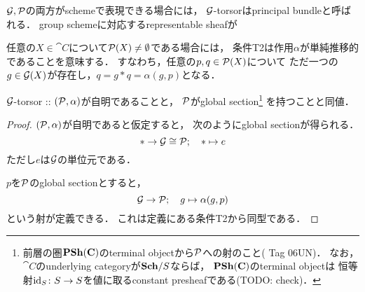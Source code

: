 \documentclass[a4paper, dvipdfmx]{jsarticle}
\begin{document}
\begin{Remark}
    $\shG, \shP$の両方がschemeで表現できる場合には，
    $\shG$-torsorはprincipal bundleと呼ばれる．
    group schemeに対応するrepresentable sheafが
\end{Remark}

\begin{Remark}
    任意の$X \in \cat{C}$について$\shP(X) \neq \emptyset$である場合には，
    条件T2は作用$\alpha$が単純推移的であることを意味する．
    すなわち，任意の$p, q \in \shP(X)$について
    ただ一つの$g \in \shG(X)$が存在し，$q=g \ast q=\alpha(g, p)$となる．
\end{Remark}

\begin{Lemma}
    $\shG$-torsor :: $(\shP, \alpha)$が自明であることと，
    $\shP$がglobal section\footnote
    {
        前層の圏$\PSh(\cat{C})$のterminal objectから$\shP$への射のこと(\cite{StacksProj} Tag 06UN)．
        なお，$\cat{C}$のunderlying categoryが$\Sch/S$ならば，
        $\PSh(\cat{C})$のterminal objectは
        恒等射$\id[S] \colon S \to S$を値に取るconstant presheafである(TODO: check)．
    }
    を持つことと同値．
\end{Lemma}
\begin{proof}
    $(\shP, \alpha)$が自明であると仮定すると，
    次のようにglobal sectionが得られる．
    \[ * \to \shG \iso \shP; \quad * \mapsto e \]
    ただし$e$は$\shG$の単位元である．

    $p$を$\shP$のglobal sectionとすると，
    \[ \shG \to \shP; \quad g \mapsto \alpha(g, p) \]
    という射が定義できる．
    これは定義にある条件T2から同型である．
\end{proof}
\end{document}
